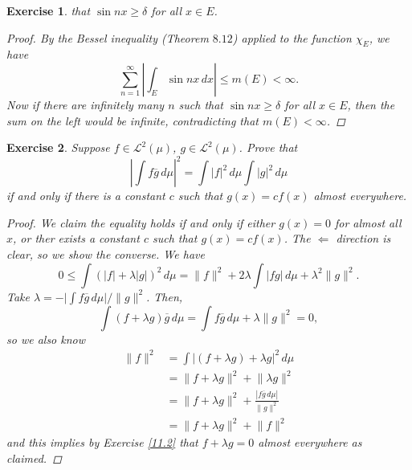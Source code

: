 \documentclass[10pt,letterpaper]{amsart}
\newtheorem{exercise}{Exercise}[section]
\theoremstyle{definition}
\theoremstyle{remark}
\numberwithin{equation}{exercise}
\begin{document}
\begin{multicols}{2}
\begin{exercise}
    that $\sin nx \ge \delta$ for all $x \in E$.
    \begin{proof}
      By the Bessel inequality (Theorem $8.12$) applied to the function $\chi_E$,
      we have
      \begin{equation*}
        \sum_{n=1}^\infty \left\lvert \int_E \sin nx\,dx \right\rvert \le m(E) <
        \infty.
      \end{equation*}
      Now if there are infinitely many $n$ such that $\sin nx \ge \delta$ for
      all $x \in E$, then the sum on the left would be infinite, contradicting
      that $m(E) < \infty$.
    \end{proof}
  \end{exercise}
  \begin{exercise}
    Suppose $f \in \mathscr{L}^2(\mu)$, $g \in \mathscr{L}^2(\mu)$. Prove that
    \begin{equation*}
      \left\lvert \int f\overline{g}\,d\mu \right\rvert^2 = \int \lvert f
      \rvert^2\,d\mu\int\lvert g \rvert^2\,d\mu
    \end{equation*}
    if and only if there is a constant $c$ such that $g(x) = cf(x)$ almost
    everywhere.
    \begin{proof}
      We claim the equality holds if and only if either $g(x) = 0$ for almost
      all $x$, or ther exists a constant $c$ such that $g(x) = cf(x)$.
      The $\Leftarrow$ direction is clear, so we show the converse.
      We have
      \begin{equation*}
        0 \le \int (\lvert f \rvert + \lambda \lvert g \rvert )^2\,d\mu = \lVert
        f \rVert^2 + 2\lambda\int\lvert fg \rvert\,d\mu + \lambda^2 \lVert g
        \rVert^2.
      \end{equation*}
      Take $\lambda = - \lvert \int f\overline{g}\,d\mu \rvert/\lVert g \rVert^2$.
      Then,
      \begin{equation*}
        \int (f + \lambda g)\overline{g}\,d\mu = \int f\overline{g}\,d\mu +
        \lambda \lVert g \rVert^2 = 0,
      \end{equation*}
      so we also know
      \begin{align*}
        \lVert f \rVert^2 &= \int \lvert (f+\lambda g) + \lambda
        g\rvert^2\,d\mu\\
        &= \lVert f + \lambda g \rVert^2 + \lVert \lambda g \rVert^2\\
        &= \lVert f + \lambda g \rVert^2 + \frac{\left\lvert f \overline{g}\,d\mu
        \right\rvert}{\lVert g \rVert^2}\\
        &= \lVert f + \lambda g \rVert^2 + \lVert f \rVert^2
      \end{align*}
      and this implies by Exercise \ref{11.2} that $f + \lambda g = 0$ almost
      everywhere as claimed.
    \end{proof}
  \end{exercise}
\end{multicols}
\end{document}
